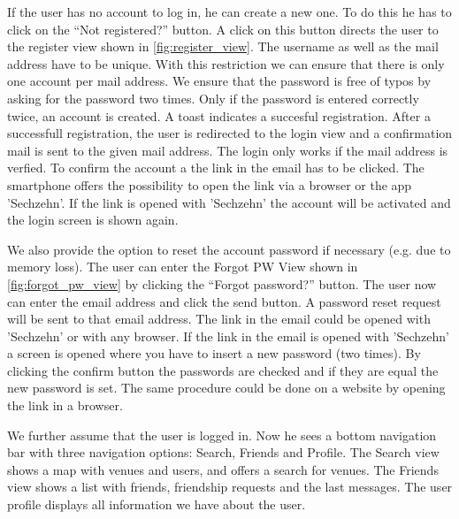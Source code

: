 \documentclass[11pt, accentcolor=tud1c]{tudreport}
\begin{document}
If the user has no account to log in, he can create a new one. To do this he has to click on the ``Not registered?'' button. A click on this button directs the user to the register view shown in \autoref{fig:register_view}. The username as well as the mail address have to be unique. With this restriction we can ensure that there is only one account per mail address. We ensure that the password is free of typos by asking for the password two times. Only if the password is entered correctly twice, an account is created. A toast indicates a succesful registration. After a successfull registration, the user is redirected to the login view and a confirmation mail is sent to the given mail address. The login only works if the mail address is verfied. To confirm the account a the link in the email has to be clicked. The smartphone offers the possibility to open the link via a browser or the app 'Sechzehn'. If the link is opened with 'Sechzehn' the account will be activated and the login screen is shown again.

We also provide the option to reset the account password if necessary (e.g. due to memory loss). 
The user can enter the Forgot PW View shown in \autoref{fig:forgot_pw_view} by clicking the ``Forgot password?'' button. The user now can enter the email address and click the send button. A password reset request will be sent to that email address. The link in the email could be opened with 'Sechzehn' or with any browser. If the link in the email is opened with 'Sechzehn' a screen is opened where you have to insert a new password (two times). By clicking the confirm button the passwords are checked and if they are equal the new password is set. The same procedure could be done on a website by opening the link in a browser.

We further assume that the user is logged in. Now he sees a bottom navigation bar with three navigation options: Search, Friends and Profile. The Search view shows a map with venues and users, and offers a search for venues. The Friends view shows a list with friends, friendship requests and the last messages. The user profile displays all information we have about the user. 
\end{document}
